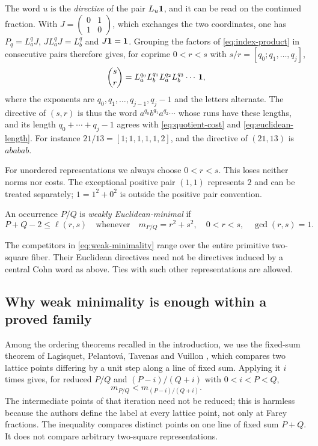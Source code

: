 The word $u$ is the \emph{directive} of the pair $L_u{\bf1}$, and it can be
read on the continued fraction. With
$J=\left(\begin{smallmatrix}0&1\\1&0\end{smallmatrix}\right)$, which exchanges
the two coordinates, one has $P_q=L_a^qJ$, $JL_a^qJ=L_b^q$ and $J{\bf1}={\bf1}$.
Grouping the factors of \eqref{eq:index-product} in consecutive pairs
therefore gives, for coprime $0<r<s$ with $s/r=[q_0;q_1,\ldots,q_j]$,
$$
 \binom sr=L_a^{q_0}L_b^{q_1}L_a^{q_2}L_b^{q_3}\cdots\,{\bf1},
$$
where the exponents are $q_0,q_1,\ldots,q_{j-1},q_j-1$ and the letters
alternate. The directive of $(s,r)$ is thus the word
$a^{q_0}b^{q_1}a^{q_2}\cdots$ whose runs have these lengths, and its length
$q_0+\cdots+q_j-1$ agrees with \eqref{eq:quotient-cost} and
\eqref{eq:euclidean-length}. For instance $21/13=[1;1,1,1,1,2]$, and the
directive of $(21,13)$ is $ababab$.

For unordered representations we always choose $0<r<s$. This loses
neither norms nor costs. The exceptional positive pair $(1,1)$ represents
$2$ and can be treated separately; $1=1^2+0^2$ is outside the positive
pair convention.

\begin{definition}\label{def:weak-minimality}
An occurrence $P/Q$ is \emph{weakly Euclidean-minimal} if
\begin{equation}\label{eq:weak-minimality}
 P+Q-2\leqslant\ell(r,s)
 \quad\text{whenever}\quad
 m_{P/Q}=r^2+s^2,\quad 0<r<s,\quad\gcd(r,s)=1.
\end{equation}
\end{definition}

The competitors in \eqref{eq:weak-minimality} range over the entire
primitive two-square fiber. Their Euclidean directives need not be
directives induced by a central Cohn word as above.
Ties with such other representations are allowed.

\subsection{Why weak minimality is enough within a proved family}

Among the ordering theorems recalled in the introduction, we use the
fixed-sum theorem of Lagisquet, Pelantov\'a, Tavenas and Vuillon
\cite[Theorem~2, item~3]{LagisquetEtAl2021}, which compares two lattice points
differing by a unit step along a line of fixed sum.
Applying it $i$ times gives, for reduced $P/Q$ and
$(P-i)/(Q+i)$ with $0<i<P<Q$,
\begin{equation}\label{eq:fixed-sum-order}
 m_{P/Q}<m_{(P-i)/(Q+i)}.
\end{equation}
The intermediate points of that iteration need not be reduced; this is
harmless because the authors define the label at every lattice point,
not only at Farey fractions.
The inequality compares distinct points on one line of fixed sum $P+Q$.
It does not compare arbitrary two-square representations.

